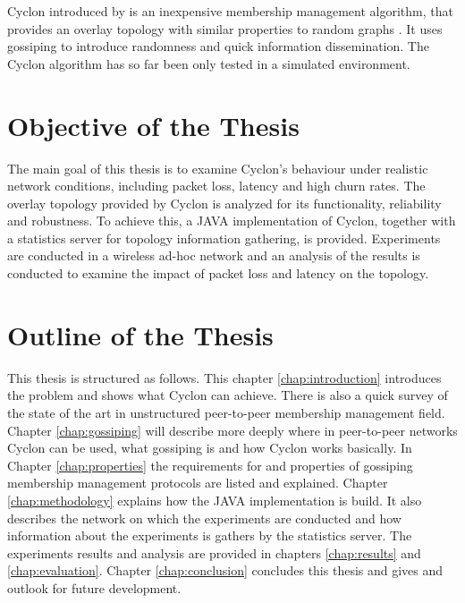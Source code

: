 Cyclon introduced by \cite{voulgaris2005cyclon} is an inexpensive membership
management algorithm, that provides an overlay topology with similar properties
to random graphs \cite{Bollobas1985}. It uses gossiping to introduce randomness
and quick information dissemination. The Cyclon algorithm has so far been only
tested in a simulated environment.

\section{Objective of the Thesis} 
The main goal of this thesis is to examine Cyclon's behaviour under realistic
network conditions, including packet loss, latency and high churn rates. The
overlay topology provided by Cyclon is analyzed for its functionality,
reliability and robustness. To achieve this, a JAVA implementation of Cyclon,
together with a statistics server for topology information gathering, is
provided. Experiments are conducted in a wireless ad-hoc network and an
analysis of the results is conducted to examine the impact of packet loss and
latency on the topology. 

 \section{Outline of the Thesis} %
This thesis is structured as follows. This chapter \ref{chap:introduction}
introduces the problem and shows what Cyclon can achieve. There is also a quick
survey of the state of the art in unstructured peer-to-peer membership
management field. Chapter \ref{chap:gossiping} will describe more deeply where
in peer-to-peer networks Cyclon can be used, what gossiping is and how Cyclon
works basically. In Chapter \ref{chap:properties} the requirements for and
properties of gossiping membership management protocols are listed and
explained. Chapter \ref{chap:methodology} explains how the JAVA implementation
is build. It also describes the network on which the experiments are conducted
and how information about the experiments is gathers by the statistics server.
The experiments results and analysis are provided in chapters \ref{chap:results}
and \ref{chap:evaluation}. Chapter \ref{chap:conclusion} concludes this thesis
and gives and outlook for future development.


